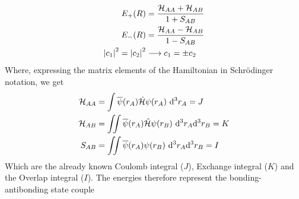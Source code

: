 \documentclass[../qm.tex]{subfiles}
\begin{document}
	\begin{equation}
		\begin{aligned}
			E_+(R)&=\frac{\mathcal{H}_{AA}+\mathcal{H}_{AB}}{1+S_{AB}}\\
			E_-(R)&=\frac{\mathcal{H}_{AA}-\mathcal{H}_{AB}}{1-S_{AB}}\\
			\abs{c_1}^2=\abs{c_2}^2&\longrightarrow c_1=\pm c_2
		\end{aligned}
		\label{eq:egeradeungeradevarlcao}
	\end{equation}
	Where, expressing the matrix elements of the Hamiltonian in Schrödinger notation, we get
	\begin{equation}
		\begin{aligned}
			\mathcal{H}_{AA}&=\int\cc{\psi}(r_A)\opr{\ham}\psi(r_A)\diff[3]{r_A}=J\\
			\mathcal{H}_{AB}&=\iint\cc{\psi}(r_A)\opr{\ham}\psi(r_B)\ddiff[3]{r_A}{r_B}=K\\
			S_{AB}&=\iint\cc{\psi}(r_A)\psi(r_B)\ddiff[3]{r_A}{r_B}=I
		\end{aligned}
		\label{eq:integralsmatrixelementsvarlcao}
	\end{equation}
	Which are the already known Coulomb integral ($J$), Exchange integral ($K$) and the Overlap integral ($I$). The energies therefore represent the bonding-antibonding state couple
\end{document}
